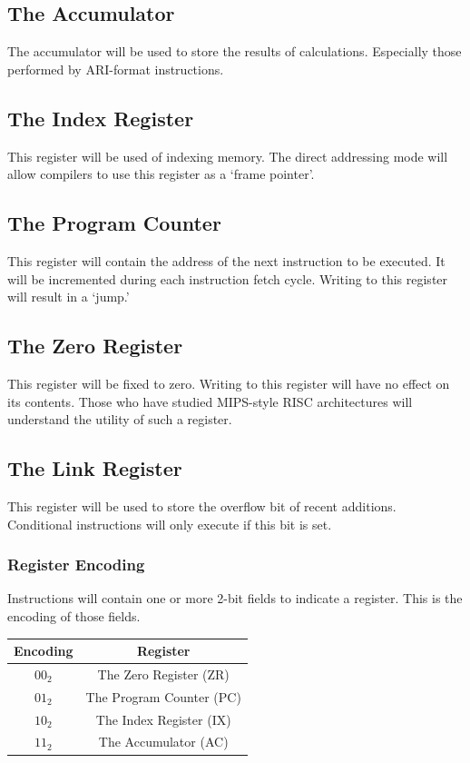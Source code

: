 \documentclass{article}
\begin{document}
\subsection{The Accumulator}
The accumulator will be used to store the results of calculations. 
Especially those performed by ARI-format instructions.

\subsection{The Index Register}
This register will be used of indexing memory.
The direct addressing mode will allow compilers to use this register as a `frame pointer'.

\subsection{The Program Counter}
This register will contain the address of the next instruction to be executed. 
It will be incremented during each instruction fetch cycle. 
Writing to this register will result in a `jump.'

\subsection{The Zero Register}
This register will be fixed to zero. 
Writing to this register will have no effect on its contents.
Those who have studied MIPS-style RISC architectures will understand the utility of such a register.

\subsection{The Link Register}
This register will be used to store the overflow bit of recent additions. 
Conditional instructions will only execute if this bit is set.

\subsubsection{Register Encoding}
Instructions will contain one or more 2-bit fields to indicate a register. This is the encoding of those fields.

\begin{center}
    \begin{tabular}{|c|c|}
        \hline
        Encoding & Register \\
        \hline
        $00_2$ & The Zero Register (ZR) \\
        \hline
        $01_2$ & The Program Counter (PC) \\
        \hline
        $10_2$ & The Index Register (IX) \\
        \hline
        $11_2$ & The Accumulator (AC) \\
        \hline
    \end{tabular}
\end{center}
\end{document}
